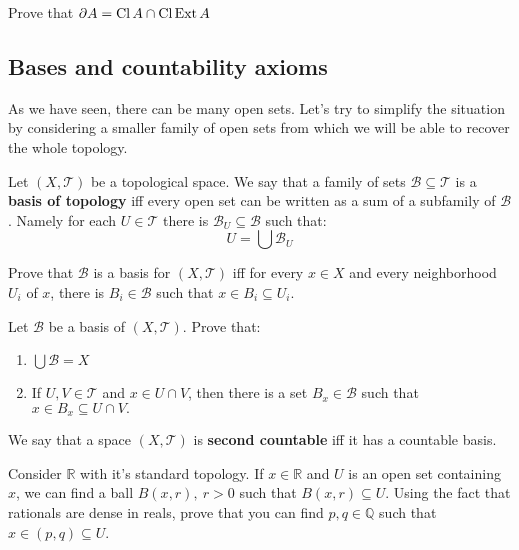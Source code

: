 \begin{prob}
  Prove that $\partial A=\text{Cl\,} A \cap \text{Cl\,} \text{Ext\,} A$
\end{prob}

\subsection{Bases and countability axioms}
As we have seen, there can be many open sets. Let's try to simplify the situation by considering a smaller
family of open sets from which we will be able to recover the whole topology.

Let $(X, \mathcal T)$ be a topological space. We say that a family of sets $\mathcal B\subseteq \mathcal T$
is a \textbf{basis of topology} iff every open set can be written as a sum of a subfamily of $\mathcal B$.
Namely for each $U\in \mathcal T$ there is $\mathcal B_U\subseteq \mathcal B$ such that:
$$U=\bigcup \mathcal B_U$$

\begin{prob}
  Prove that $\mathcal B$ is a basis for $(X, \mathcal T)$ iff
  for every $x\in X$ and every neighborhood $U_i$ of $x$, there
  is $B_i\in \mathcal B$ such that $x\in B_i\subseteq U_i$.
\end{prob}

\begin{prob}
  Let $\mathcal B$ be a basis of $(X, \mathcal T)$. Prove that:
  \begin{enumerate}
    \item $\bigcup \mathcal B = X$
    \item If $U, V\in \mathcal T$ and $x\in U\cap V$, then there is a
      set $B_x\in \mathcal B$ such that $x\in B_x\subseteq U\cap V.$
  \end{enumerate}
\end{prob}


We say that a space $(X,\mathcal T)$ is \textbf{second countable} iff
it has a countable basis.

\begin{prob}
  Consider $\mathbb R$ with it's standard topology. If $x\in \mathbb R$ and $U$ is an open set containing $x$, we can find a ball $B(x, r),~r>0$ such that $B(x,r)\subseteq U$. Using the fact that
  rationals are dense in reals, prove that you can
  find $p,q\in \mathbb Q$ such that $x\in (p,q)\subseteq U$.
\end{prob}

